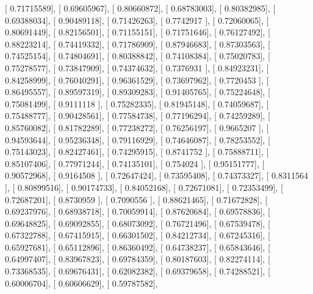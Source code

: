 \documentclass{article}
\begin{document}
       [ 0.71715589],
       [ 0.69605967],
       [ 0.80660872],
       [ 0.68783003],
       [ 0.80382985],
       [ 0.69388034],
       [ 0.90489118],
       [ 0.71426263],
       [ 0.7742917 ],
       [ 0.72060065],
       [ 0.80691449],
       [ 0.82156501],
       [ 0.71155151],
       [ 0.71751646],
       [ 0.76127492],
       [ 0.88223214],
       [ 0.74419332],
       [ 0.71786909],
       [ 0.87946683],
       [ 0.87303563],
       [ 0.74525154],
       [ 0.74804691],
       [ 0.80388842],
       [ 0.74108384],
       [ 0.75020783],
       [ 0.75278577],
       [ 0.73847909],
       [ 0.74374632],
       [ 0.7376931 ],
       [ 0.84923231],
       [ 0.84258999],
       [ 0.76040291],
       [ 0.96361529],
       [ 0.73697962],
       [ 0.7720453 ],
       [ 0.86495557],
       [ 0.89597319],
       [ 0.89309283],
       [ 0.91405765],
       [ 0.75224648],
       [ 0.75081499],
       [ 0.9111118 ],
       [ 0.75282335],
       [ 0.81945148],
       [ 0.74059687],
       [ 0.75488777],
       [ 0.90428561],
       [ 0.77584738],
       [ 0.77196294],
       [ 0.74259289],
       [ 0.85760082],
       [ 0.81782289],
       [ 0.77238272],
       [ 0.76256197],
       [ 0.9665207 ],
       [ 0.94593644],
       [ 0.95236348],
       [ 0.79116929],
       [ 0.74646087],
       [ 0.78253552],
       [ 0.75143023],
       [ 0.82427461],
       [ 0.74295915],
       [ 0.8741752 ],
       [ 0.75888711],
       [ 0.85107406],
       [ 0.77971244],
       [ 0.74135101],
       [ 0.754024  ],
       [ 0.95151777],
       [ 0.90572968],
       [ 0.9164508 ],
       [ 0.72647424],
       [ 0.73595408],
       [ 0.74373327],
       [ 0.8311564 ],
       [ 0.80899516],
       [ 0.90174733],
       [ 0.84052168],
       [ 0.72671081],
       [ 0.72353499],
       [ 0.72687201],
       [ 0.8730959 ],
       [ 0.7090556 ],
       [ 0.88621465],
       [ 0.71672828],
       [ 0.69237976],
       [ 0.68938718],
       [ 0.70059914],
       [ 0.87620684],
       [ 0.69578836],
       [ 0.69648825],
       [ 0.69092855],
       [ 0.68073092],
       [ 0.76721496],
       [ 0.67539478],
       [ 0.67322788],
       [ 0.67415915],
       [ 0.66301502],
       [ 0.84212734],
       [ 0.67245316],
       [ 0.65927681],
       [ 0.65112896],
       [ 0.86360492],
       [ 0.64738237],
       [ 0.65843646],
       [ 0.64997407],
       [ 0.83967823],
       [ 0.69784359],
       [ 0.80187603],
       [ 0.82274114],
       [ 0.73368535],
       [ 0.69676431],
       [ 0.62082382],
       [ 0.69379658],
       [ 0.74288521],
       [ 0.60006704],
       [ 0.60606629],
       [ 0.59787582],
\end{document}
